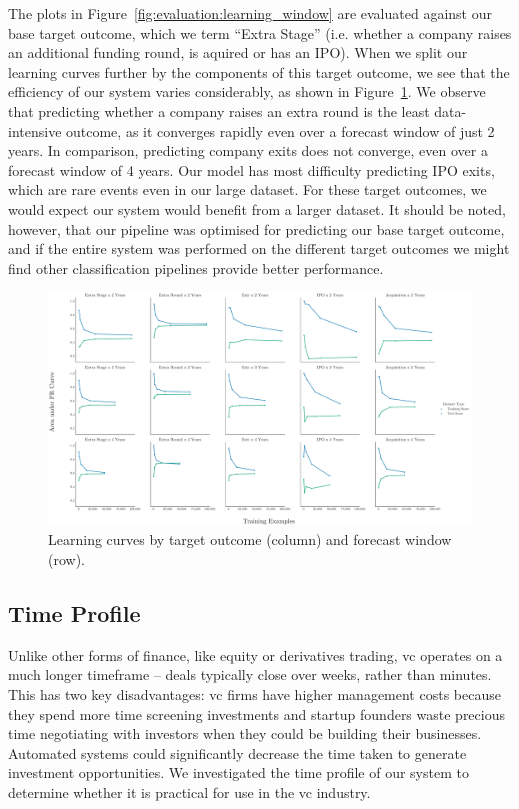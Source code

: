 ﻿\documentclass[../thesis/thesis.tex]{subfiles}
\begin{document}
The plots in Figure~\ref{fig:evaluation:learning_window} are evaluated against our base target outcome, which we term ``Extra Stage'' (i.e. whether a company raises an additional funding round, is aquired or has an IPO). When we split our learning curves further by the components of this target outcome, we see that the efficiency of our system varies considerably, as shown in Figure~\ref{fig:evaluation:learning_outcome_window}. We observe that predicting whether a company raises an extra round is the least data-intensive outcome, as it converges rapidly even over a forecast window of just 2 years. In comparison, predicting company exits does not converge, even over a forecast window of 4 years. Our model has most difficulty predicting IPO exits, which are rare events even in our large dataset. For these target outcomes, we would expect our system would benefit from a larger dataset. It should be noted, however, that our pipeline was optimised for predicting our base target outcome, and if the entire system was performed on the different target outcomes we might find other classification pipelines provide better performance.

\begin{figure}[!htb]
    \centering
    \includegraphics[width=\textwidth]{../figures/evaluation/learning_curves_outcome}
    \caption[Learning curves by target outcome]{Learning curves by target outcome (column) and forecast window (row).}
    \label{fig:evaluation:learning_outcome_window}
\end{figure}

\subsection{Time Profile}

Unlike other forms of finance, like equity or derivatives trading, \gls{vc} operates on a much longer timeframe -- deals typically close over weeks, rather than minutes. This has two key disadvantages: \gls{vc} firms have higher management costs because they spend more time screening investments and startup founders waste precious time negotiating with investors when they could be building their businesses. Automated systems could significantly decrease the time taken to generate investment opportunities. We investigated the time profile of our system to determine whether it is practical for use in the \gls{vc} industry.
\end{document}
